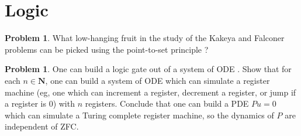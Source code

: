 \documentclass[reqno,11pt]{amsart}
\newcommand{\NN}{\mathbf{N}}
\theoremstyle{definition}
\newtheorem{problem}[theorem]{Problem}
\numberwithin{equation}{section}
\begin{document}
\section{Logic}
\begin{problem}
What low-hanging fruit in the study of the Kakeya and Falconer problems can be picked using the point-to-set principle \cite{Lutz18}?
\end{problem}

\begin{problem}
One can build a logic gate out of a system of ODE \cite{Tao16}.
Show that for each $n \in \NN$, one can build a system of ODE which can simulate a register machine (eg, one which can increment a register, decrement a register, or jump if a register is $0$) with $n$ registers.
Conclude that one can build a PDE $Pu = 0$ which can simulate a Turing complete register machine, so the dynamics of $P$ are independent of ZFC.
\end{problem}



\printbibliography
\end{document}
